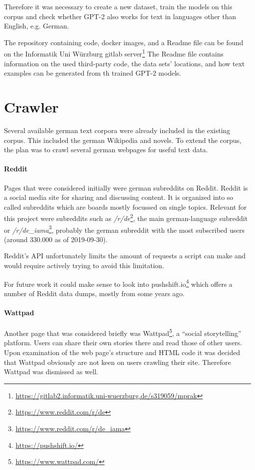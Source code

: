 \documentclass{scrartcl}
\begin{document}
Therefore it was necessary to create a new dataset, train the models on this corpus and check whether GPT-2 also works for text in languages other than English, e.g. German.



The repository containing code, docker images, and a Readme file can be found on the Informatik Uni Würzburg gitlab server\footnote{\url{https://gitlab2.informatik.uni-wuerzburg.de/s319059/mprak}}
The Readme file contains information on the used third-party code, the data sets' locations, and how text examples can be generated from th trained GPT-2 models. 

\section{Crawler}

Several available german text corpora were already included in the existing corpus. This included the german Wikipedia and novels. 
To extend the corpus, the plan was to crawl several german webpages for useful text data.

\paragraph{Reddit}
Pages that were considered initially were german subreddits on Reddit. Reddit is a social media site for sharing and discussing content. It is organized into so called subreddits which are boards mostly focussed on single topics. Relevant for this project were subreddits such as \textit{/r/de}\footnote{\url{https://www.reddit.com/r/de}}, the main german-language subreddit or \textit{/r/de\_iama}\footnote{\url{https://www.reddit.com/r/de\_iama}}, probably the german subreddit with the most subscribed users (around 330.000 as of 2019-09-30).

Reddit's API unfortunately limits the amount of requests a script can make and would require actively trying to avoid this limitation.

For future work it could make sense to look into pushshift.io\footnote{\url{https://pushshift.io/}} which offers a number of Reddit data dumps, mostly from some years ago.

\paragraph{Wattpad}

Another page that was considered briefly was Wattpad\footnote{\url{https://www.wattpad.com/}}, a \enquote{social storytelling} platform. Users can share their own stories there and read those of other users. Upon examination of the web page's structure and HTML code it was decided that Wattpad obviously are not keen on users crawling their site. Therefore Wattpad was dismissed as well.
\end{document}
